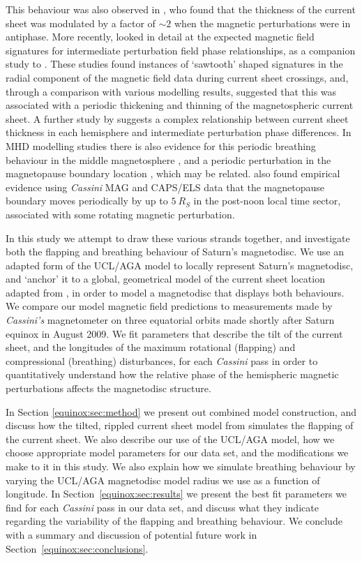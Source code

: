 This behaviour was also observed in \citet{provan2012}, who found that the thickness of the current sheet was modulated by a factor of ${\sim}2$ when the magnetic perturbations were in antiphase. More recently, \citet{thomsen2017} looked in detail at the expected magnetic field signatures for intermediate perturbation field phase relationships, as a companion study to \citet{cowley2017a}. These studies found instances of `sawtooth' shaped signatures in the radial component of the magnetic field data during current sheet crossings, and, through a comparison with various modelling results, suggested that this was associated with a periodic thickening and thinning of the magnetospheric current sheet. A further study by \citet{cowley2017b} suggests a complex relationship between current sheet thickness in each hemisphere and intermediate perturbation phase differences. In MHD modelling studies there is also evidence for this periodic breathing behaviour in the middle magnetosphere \citep{ramer2016}, and a periodic perturbation in the magnetopause boundary location \citep{kivelson2014}, which may be related. \citet{clarke2010} also found empirical evidence using \textit{Cassini} MAG and CAPS/ELS data that the magnetopause boundary moves periodically by up to $\SI{5}{R_S}$ in the post-noon local time sector, associated with some rotating  magnetic perturbation.

In this study we attempt to draw these various strands together, and investigate both the flapping and breathing behaviour of Saturn's magnetodisc. We use an adapted form of the UCL/AGA model to locally represent Saturn's magnetodisc, and `anchor' it to a global, geometrical model of the current sheet location adapted from \citet{arridge2011}, in order to model a magnetodisc that displays both behaviours. We compare our model magnetic field predictions to measurements made by \textit{Cassini's} magnetometer on three equatorial orbits made shortly after Saturn equinox in August 2009. We fit parameters that describe the tilt of the current sheet, and the longitudes of the maximum rotational (flapping) and compressional (breathing) disturbances, for each \textit{Cassini} pass in order to quantitatively understand how the relative phase of the hemispheric magnetic perturbations affects the magnetodisc structure. 

In Section \ref{equinox:sec:method} we present out combined model construction, and discuss how the tilted, rippled current sheet model from \cite{arridge2011} simulates the flapping of the current sheet. We also describe our use of the UCL/AGA model, how we choose appropriate model parameters for our data set, and the modifications we make to it in this study. We also explain how we simulate breathing behaviour by varying the UCL/AGA magnetodisc model radius we use as a function of longitude. In Section~\ref{equinox:sec:results} we present the best fit parameters we find for each \textit{Cassini} pass in our data set, and discuss what they indicate regarding the variability of the flapping and breathing behaviour. We conclude with a summary and discussion of potential future work in Section~\ref{equinox:sec:conclusions}.

